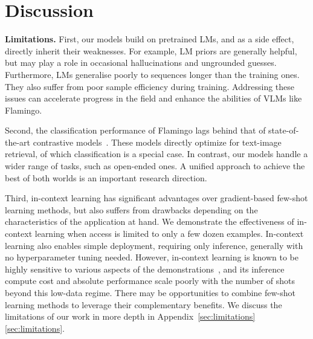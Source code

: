 \section{Discussion}

\label{sec:discussion}

\textbf{Limitations.} First, our models build on pretrained LMs, and as a side effect, directly inherit their weaknesses. For example, LM priors are generally helpful, but may play a role in occasional hallucinations and ungrounded guesses. Furthermore, LMs generalise poorly to sequences longer than the training ones. They also suffer from poor sample efficiency during training. Addressing these issues can accelerate progress in the field and enhance the abilities of VLMs like Flamingo.

Second, the classification performance of Flamingo lags behind that of state-of-the-art contrastive models~\citep{clip,pham2021combined}. These models directly optimize for text-image retrieval, of which classification is a special case. In contrast, our models handle a wider range of tasks, such as open-ended ones. A unified approach to achieve the best of both worlds is an important research direction.

Third, in-context learning has significant advantages over gradient-based few-shot learning methods, but also suffers from drawbacks depending on the characteristics of the application at hand. We demonstrate the effectiveness of in-context learning when access is limited to only a few dozen examples. In-context learning also enables simple deployment, requiring only inference, generally with no hyperparameter tuning needed. However, in-context learning is known to be highly sensitive to various aspects of the demonstrations~\citep{zhao2021calibrate,truefewshot}, and its inference compute cost and absolute performance scale poorly with the number of shots beyond this low-data regime. There may be opportunities to combine few-shot learning methods to leverage their complementary benefits. We discuss the limitations of our work in more depth in Appendix~\ifwithappendix\ref{sec:limitations}\else\ref*{sec:limitations}\fi.

